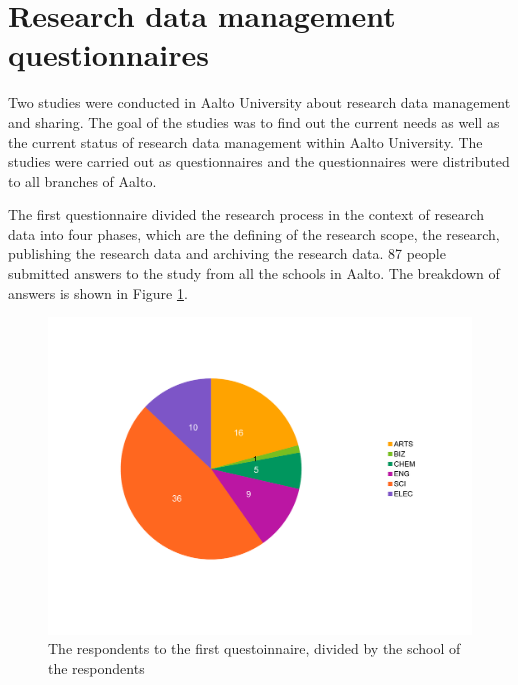 \fi

\section{Research data management questionnaires}
\label{sec:questionnaire}

Two studies were conducted in Aalto University about research data management
and sharing. The goal of the studies was to find out the current needs as well
as the current status of research data management within Aalto University. The
studies were carried out as questionnaires and the questionnaires were
distributed to all branches of Aalto.

The first questionnaire divided
the research process in the context of research data into four phases, which
are the defining of the research scope, the research, publishing the research
data and archiving the research data. 87 people submitted answers to the study from all the
schools in Aalto. The breakdown of answers is shown in Figure \ref{fig:chart_answers}.

\begin{figure}
    \begin{centering}
        \includegraphics[width=\textwidth]{images/chart_answers}
    \end{centering}
    \caption{The respondents to the first questoinnaire, divided by the school of the respondents}
    \label{fig:chart_answers}
\end{figure}

